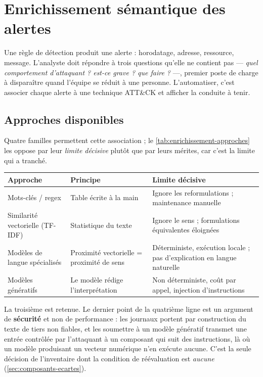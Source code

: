 \section{Enrichissement sémantique des alertes}
\label{sec:enrichissement}

Une règle de détection produit une alerte : horodatage, adresse, ressource, message. L'analyste
doit répondre à trois questions qu'elle ne contient pas --- \emph{quel comportement d'attaquant ?
est-ce grave ? que faire ?} ---, premier poste de charge à disparaître quand l'équipe se réduit à
une personne. L'automatiser, c'est associer chaque alerte à une technique ATT\&CK et afficher la
conduite à tenir.

\subsection{Approches disponibles}
\label{sec:enrichissement-approches}

Quatre familles permettent cette association ; le \cref{tab:enrichissement-approches} les oppose
par leur \emph{limite décisive} plutôt que par leurs mérites, car c'est la limite qui a tranché.

\begingroup
\centering
{}
\label{tab:enrichissement-approches}
\scriptsize
\begin{tabular}{|P{3.7cm}|P{5.0cm}|P{6.6cm}|}
\hline
Approche & Principe & Limite décisive \\
\hline
Mots-clés / regex & Table écrite à la main &
Ignore les reformulations ; maintenance manuelle \\ \hline
Similarité vectorielle (TF-IDF) & Statistique du texte &
Ignore le sens ; formulations équivalentes éloignées \\ \hline
Modèles de langue spécialisés & Proximité vectorielle = proximité de sens &
Déterministe, exécution locale ; pas d'explication en langue naturelle \\ \hline
Modèles génératifs & Le modèle rédige l'interprétation &
Non déterministe, coût par appel, injection d'instructions \\
\hline
\end{tabular}
\endgroup
\medskip

La troisième est retenue. Le dernier point de la quatrième ligne est un argument de
\textbf{sécurité} et non de performance : les journaux portent par construction du texte de tiers
non fiables, et les soumettre à un modèle génératif transmet une entrée contrôlée par l'attaquant
à un composant qui suit des instructions, là où un modèle produisant un vecteur numérique n'en
exécute aucune. C'est la seule décision de l'inventaire dont la condition de réévaluation est
\emph{aucune} (\cref{sec:composants-ecartes}).

